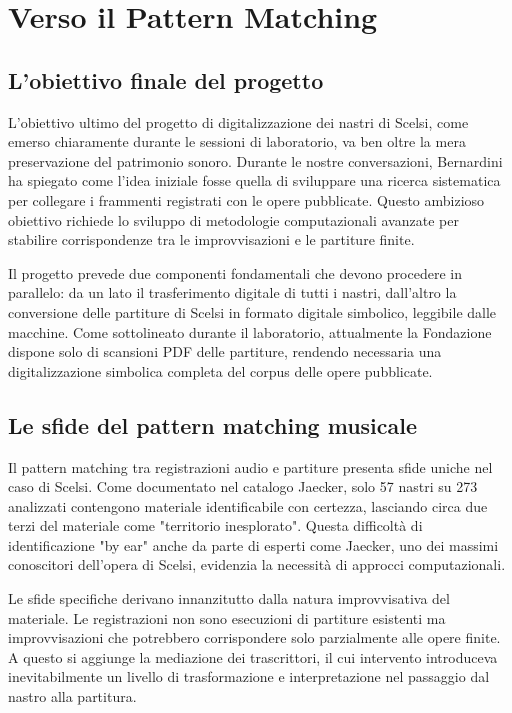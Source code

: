 \section{Verso il Pattern Matching}

\subsection{L'obiettivo finale del progetto}

L'obiettivo ultimo del progetto di digitalizzazione dei nastri di Scelsi, come emerso chiaramente durante le sessioni di laboratorio, va ben oltre la mera preservazione del patrimonio sonoro. Durante le nostre conversazioni, Bernardini ha spiegato come l'idea iniziale fosse quella di sviluppare una ricerca sistematica per collegare i frammenti registrati con le opere pubblicate. Questo ambizioso obiettivo richiede lo sviluppo di metodologie computazionali avanzate per stabilire corrispondenze tra le improvvisazioni e le partiture finite.

Il progetto prevede due componenti fondamentali che devono procedere in parallelo: da un lato il trasferimento digitale di tutti i nastri, dall'altro la conversione delle partiture di Scelsi in formato digitale simbolico, leggibile dalle macchine. Come sottolineato durante il laboratorio, attualmente la Fondazione dispone solo di scansioni PDF delle partiture, rendendo necessaria una digitalizzazione simbolica completa del corpus delle opere pubblicate.

\subsection{Le sfide del pattern matching musicale}

Il pattern matching tra registrazioni audio e partiture presenta sfide uniche nel caso di Scelsi. Come documentato nel catalogo Jaecker, solo 57 nastri su 273 analizzati contengono materiale identificabile con certezza, lasciando circa due terzi del materiale come "territorio inesplorato"\cite[p. 47]{Bernardini2020Quanti}. Questa difficoltà di identificazione "by ear" anche da parte di esperti come Jaecker, uno dei massimi conoscitori dell'opera di Scelsi, evidenzia la necessità di approcci computazionali.

Le sfide specifiche derivano innanzitutto dalla natura improvvisativa del materiale. Le registrazioni non sono esecuzioni di partiture esistenti ma improvvisazioni che potrebbero corrispondere solo parzialmente alle opere finite. A questo si aggiunge la mediazione dei trascrittori, il cui intervento introduceva inevitabilmente un livello di trasformazione e interpretazione nel passaggio dal nastro alla partitura. 

